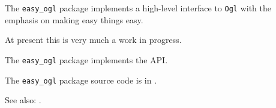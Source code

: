 
The {\tt easy\_ogl} package implements a high-level interface to 
{\tt Ogl} with the emphasis on making easy things easy.

At present this is very much a work in progress.

The {\tt easy\_ogl} package implements the  API.

The {\tt easy\_ogl} package source code is in .

See also:  .

